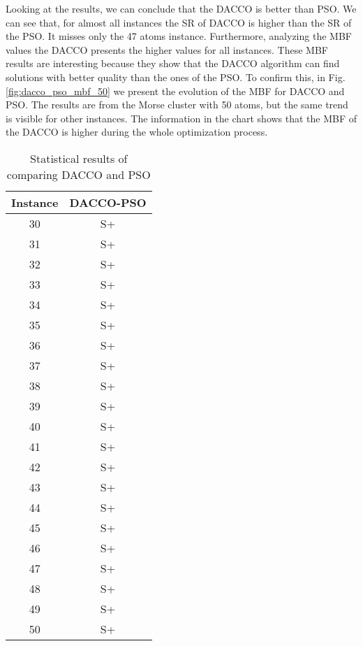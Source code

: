 		Looking at the results, we can conclude that the DACCO is better than PSO. We can see that, for almost all instances the SR of DACCO is higher than the SR of the PSO. It misses only the 47 atoms instance. Furthermore, analyzing the MBF values the DACCO presents the higher values for all instances. These MBF results are interesting because they show that the DACCO algorithm can find solutions with better quality than the ones of the PSO. To confirm this, in Fig. \ref{fig:dacco_pso_mbf_50} we present the evolution of the MBF for DACCO and PSO. The results are from the Morse cluster with 50 atoms, but the same trend is visible for other instances. The information in the chart shows that the MBF of the DACCO is higher during the whole optimization process.
		
		\pagebreak
		\begin{table}[!htdp]
				\begin{center}
					\begin{tabular}{| c | c |}
						\hline
						\textbf{Instance} & \textbf{DACCO-PSO} \\ \hline
						30 & S+ \\ \hline
						31 & S+ \\ \hline
						32 & S+ \\ \hline
						33 & S+ \\ \hline
						34 & S+ \\ \hline
						35 & S+ \\ \hline
						36 & S+ \\ \hline
						37 & S+ \\ \hline
						38 & S+ \\ \hline
						39 & S+\\ \hline
						40 & S+\\ \hline
						41 & S+ \\ \hline
						42 & S+ \\ \hline
						43 & S+ \\ \hline
						44 & S+ \\ \hline
						45 & S+ \\ \hline
						46 & S+\\ \hline
						47 & S+ \\ \hline
						48 & S+ \\ \hline 
						49 & S+ \\ \hline
						50 & S+ \\ \hline
					\end{tabular}
					\caption{Statistical results of comparing DACCO and PSO}
					\label{tab:statistical_comparison_pso}
				\end{center}
		\end{table}
		
